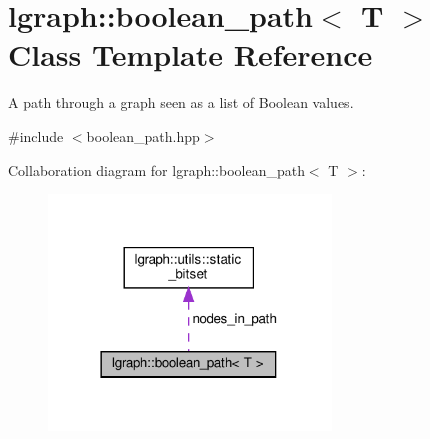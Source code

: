 \hypertarget{classlgraph_1_1boolean__path}{}\section{lgraph\+:\+:boolean\+\_\+path$<$ T $>$ Class Template Reference}
\label{classlgraph_1_1boolean__path}


A path through a graph seen as a list of Boolean values.  




{\ttfamily \#include $<$boolean\+\_\+path.\+hpp$>$}



Collaboration diagram for lgraph\+:\+:boolean\+\_\+path$<$ T $>$\+:\nopagebreak
\begin{figure}[H]
\begin{center}
\leavevmode
\includegraphics[width=213pt]{classlgraph_1_1boolean__path__coll__graph}
\end{center}
\end{figure}
